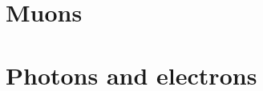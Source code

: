 \documentclass[oneside, letterpaper, 12pt, oldfontcommands]{memoir}
\begin{document}
\section{Muons} \label{sec:reconstruction_muons}


\section{Photons and electrons} \label{sec:reconstruction_egamma}
\end{document}
